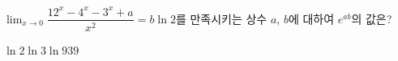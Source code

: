 $\displaystyle\lim_{x\to 0}\dfrac{12^x-4^x-3^x+a}{x^2}=b\ln 2$를 만족시키는 상수 $a$, $b$에 대하여 $e^{ab}$의 값은?
\begin{choices32}{$\ln 2$}{$\ln 3$}{$\ln 9$}{$3$}{$9$}\end{choices32}
